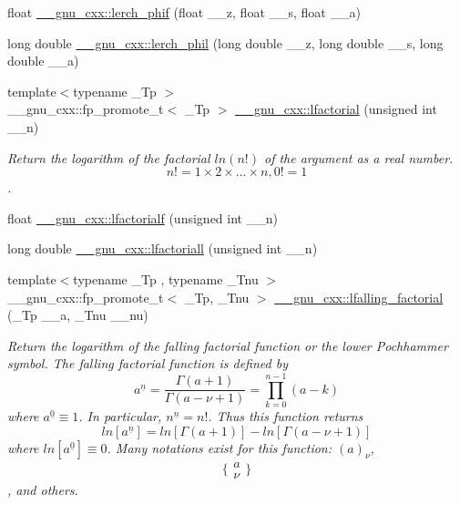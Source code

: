 \begin{DoxyCompactItemize}
\item 
float \hyperlink{group__mathsf__gnu_ga90ae3ca570b08b3f458aa83ec2759be3}{\+\_\+\+\_\+gnu\+\_\+cxx\+::lerch\+\_\+phif} (float \+\_\+\+\_\+z, float \+\_\+\+\_\+s, float \+\_\+\+\_\+a)
\item 
long double \hyperlink{group__mathsf__gnu_gab975fa919ede92ec176330809c16c8d5}{\+\_\+\+\_\+gnu\+\_\+cxx\+::lerch\+\_\+phil} (long double \+\_\+\+\_\+z, long double \+\_\+\+\_\+s, long double \+\_\+\+\_\+a)
\item 
{\footnotesize template$<$typename \+\_\+\+Tp $>$ }\\\+\_\+\+\_\+gnu\+\_\+cxx\+::fp\+\_\+promote\+\_\+t$<$ \+\_\+\+Tp $>$ \hyperlink{group__mathsf__gnu_gab256f8d7b77b9a8fefafca21827166eb}{\+\_\+\+\_\+gnu\+\_\+cxx\+::lfactorial} (unsigned int \+\_\+\+\_\+n)
\begin{DoxyCompactList}\small\item\em Return the logarithm of the factorial $ ln(n!) $ of the argument as a real number. \[ n! = 1 \times 2 \times ... \times n, 0! = 1 \]. \end{DoxyCompactList}\item 
float \hyperlink{group__mathsf__gnu_ga65af05c4093d4895a564a8d67e389a9b}{\+\_\+\+\_\+gnu\+\_\+cxx\+::lfactorialf} (unsigned int \+\_\+\+\_\+n)
\item 
long double \hyperlink{group__mathsf__gnu_ga3a0c196f34916dc68c29c89f26cbe1ee}{\+\_\+\+\_\+gnu\+\_\+cxx\+::lfactoriall} (unsigned int \+\_\+\+\_\+n)
\item 
{\footnotesize template$<$typename \+\_\+\+Tp , typename \+\_\+\+Tnu $>$ }\\\+\_\+\+\_\+gnu\+\_\+cxx\+::fp\+\_\+promote\+\_\+t$<$ \+\_\+\+Tp, \+\_\+\+Tnu $>$ \hyperlink{group__mathsf__gnu_ga2032c10640d5010666d60d9faec86c32}{\+\_\+\+\_\+gnu\+\_\+cxx\+::lfalling\+\_\+factorial} (\+\_\+\+Tp \+\_\+\+\_\+a, \+\_\+\+Tnu \+\_\+\+\_\+nu)
\begin{DoxyCompactList}\small\item\em Return the logarithm of the falling factorial function or the lower Pochhammer symbol. The falling factorial function is defined by \[ a^{\underline{n}} = \frac{\Gamma(a + 1)}{\Gamma(a - \nu + 1)} = \prod_{k=0}^{n-1} (a - k) \] where $ a^{\underline{0}} \equiv 1 $. In particular, $ n^{\underline{n}} = n! $. Thus this function returns \[ ln[a^{\underline{n}}] = ln[\Gamma(a + 1)] - ln[\Gamma(a - \nu + 1)] \] where $ ln[a^{\underline{0}}] \equiv 0 $. Many notations exist for this function\+: $ (a)_\nu $, \[ \{ \begin{array}{c} a \\ \nu \end{array} \} \], and others. \end{DoxyCompactList}\item 

\end{DoxyCompactItemize}

